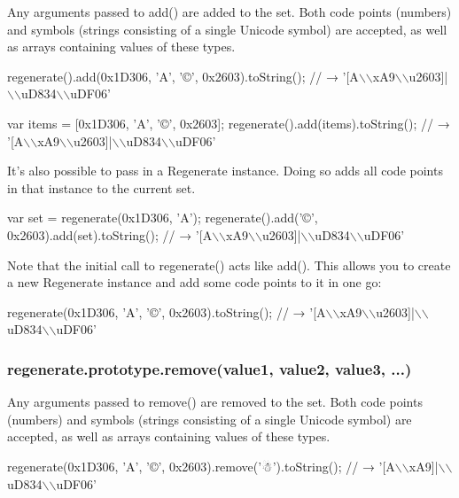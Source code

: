 Any arguments passed to {\ttfamily add()} are added to the set. Both code points (numbers) and symbols (strings consisting of a single Unicode symbol) are accepted, as well as arrays containing values of these types.


\begin{DoxyCode}
regenerate().add(0x1D306, 'A', '©', 0x2603).toString();
// → '[A\(\backslash\)\(\backslash\)xA9\(\backslash\)\(\backslash\)u2603]|\(\backslash\)\(\backslash\)uD834\(\backslash\)\(\backslash\)uDF06'

var items = [0x1D306, 'A', '©', 0x2603];
regenerate().add(items).toString();
// → '[A\(\backslash\)\(\backslash\)xA9\(\backslash\)\(\backslash\)u2603]|\(\backslash\)\(\backslash\)uD834\(\backslash\)\(\backslash\)uDF06'
\end{DoxyCode}


It’s also possible to pass in a Regenerate instance. Doing so adds all code points in that instance to the current set.


\begin{DoxyCode}
var set = regenerate(0x1D306, 'A');
regenerate().add('©', 0x2603).add(set).toString();
// → '[A\(\backslash\)\(\backslash\)xA9\(\backslash\)\(\backslash\)u2603]|\(\backslash\)\(\backslash\)uD834\(\backslash\)\(\backslash\)uDF06'
\end{DoxyCode}


Note that the initial call to {\ttfamily regenerate()} acts like {\ttfamily add()}. This allows you to create a new Regenerate instance and add some code points to it in one go\+:


\begin{DoxyCode}
regenerate(0x1D306, 'A', '©', 0x2603).toString();
// → '[A\(\backslash\)\(\backslash\)xA9\(\backslash\)\(\backslash\)u2603]|\(\backslash\)\(\backslash\)uD834\(\backslash\)\(\backslash\)uDF06'
\end{DoxyCode}


\subsubsection*{{\ttfamily regenerate.\+prototype.\+remove(value1, value2, value3, ...)}}

Any arguments passed to {\ttfamily remove()} are removed to the set. Both code points (numbers) and symbols (strings consisting of a single Unicode symbol) are accepted, as well as arrays containing values of these types.


\begin{DoxyCode}
regenerate(0x1D306, 'A', '©', 0x2603).remove('☃').toString();
// → '[A\(\backslash\)\(\backslash\)xA9]|\(\backslash\)\(\backslash\)uD834\(\backslash\)\(\backslash\)uDF06'
\end{DoxyCode}


